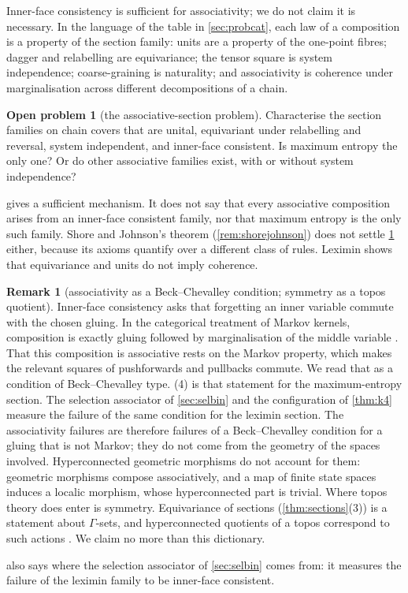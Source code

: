 \documentclass[11pt]{article}
\theoremstyle{definition}\newtheorem{definition}[theorem]{Definition}\newtheorem{remark}[theorem]{Remark}\newtheorem{example}[theorem]{Example}\newtheorem{problem}[theorem]{Open problem}\crefname{problem}{Problem}{Problems}
\begin{document}
Inner-face consistency is sufficient for associativity; we do not claim it is necessary. In the language of the table in \cref{sec:probcat}, each law of a composition is a property of the section family: units are a property of the one-point fibres; dagger and relabelling are equivariance; the tensor square is system independence; coarse-graining is naturality; and associativity is coherence under marginalisation across different decompositions of a chain.

\begin{problem}[the associative-section problem]\label{prob:assocsec}
Characterise the section families on chain covers that are unital, equivariant under relabelling and reversal, system independent, and inner-face consistent. Is maximum entropy the only one? Or do other associative families exist, with or without system independence?
\end{problem}

 gives a sufficient mechanism. It does not say that every associative composition arises from an inner-face consistent family, nor that maximum entropy is the only such family. Shore and Johnson's theorem (\cref{rem:shorejohnson}) does not settle \cref{prob:assocsec} either, because its axioms quantify over a different class of rules. Leximin shows that equivariance and units do not imply coherence.

\begin{remark}[associativity as a Beck--Chevalley condition; symmetry as a topos quotient]\label{rem:beckchevalley}
Inner-face consistency asks that forgetting an inner variable commute with the chosen gluing. In the categorical treatment of Markov kernels, composition is exactly gluing followed by marginalisation of the middle variable \cite[\S\S11--13]{Fritz2020}. That this composition is associative rests on the Markov property, which makes the relevant squares of pushforwards and pullbacks commute. We read that as a condition of Beck--Chevalley type. (4) is that statement for the maximum-entropy section. The selection associator of \cref{sec:selbin} and the configuration of \cref{thm:k4} measure the failure of the same condition for the leximin section. The associativity failures are therefore failures of a Beck--Chevalley condition for a gluing that is not Markov; they do not come from the geometry of the spaces involved. Hyperconnected geometric morphisms do not account for them: geometric morphisms compose associatively, and a map of finite state spaces induces a localic morphism, whose hyperconnected part is trivial. Where topos theory does enter is symmetry. Equivariance of sections (\cref{thm:sections}(3)) is a statement about $\Gamma$-sets, and hyperconnected quotients of a topos correspond to such actions \cite{Hora2023}. We claim no more than this dictionary.
\end{remark}  also says where the selection associator of \cref{sec:selbin} comes from: it measures the failure of the leximin family to be inner-face consistent.
\end{document}
